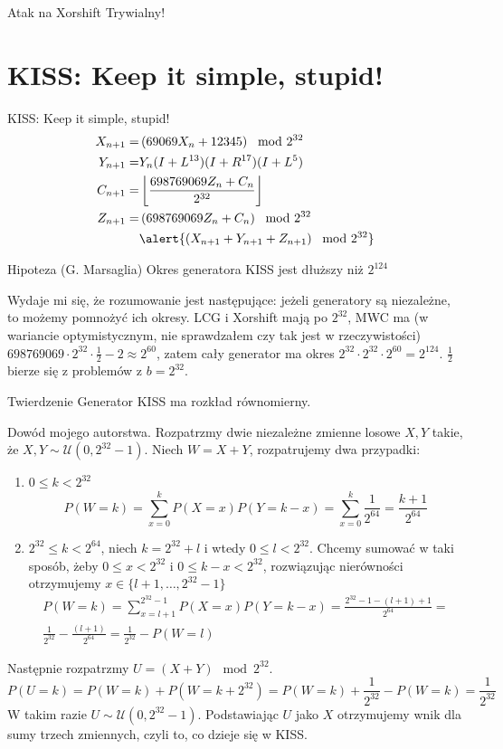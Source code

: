 \documentclass{mp}
\begin{document}
\begin{frame}{Atak na Xorshift}
\centering
\alert{Trywialny!}
\end{frame}

\section{KISS: Keep it simple, stupid!}

\begin{frame}{KISS: Keep it simple, stupid!}
\begin{align*}
X_{n+1} = & \left(69069 X_n + 12345\right) \mod 2^{32} \\
Y_{n+1} = & Y_n(I+L^{13})(I+R^{17})(I+L^5) \\
C_{n+1} = & \left\lfloor \frac{698769069Z_n+C_n}{2^{32}}\right\rfloor \\
Z_{n+1} = & \left(698769069Z_n+C_n\right) \mod 2^{32} \\
 & \alert{\left(X_{n+1}+Y_{n+1}+Z_{n+1}\right) \mod 2^{32}}
\end{align*}
\pause
\begin{block}{Hipoteza (G. Marsaglia)}
Okres generatora KISS jest dłuższy niż $2^{124}$
\end{block}
{
Wydaje mi się, że rozumowanie jest następujące: jeżeli generatory są niezależne, to możemy pomnożyć ich okresy. LCG i Xorshift mają po $2^{32}$, MWC ma (w wariancie optymistycznym, nie sprawdzałem czy tak jest w rzeczywistości) $698769069\cdot 2^{32}\cdot\frac{1}{2}-2\approx 2^{60}$, zatem cały generator ma okres $2^{32}\cdot 2^{32}\cdot 2^{60}=2^{124}$. $\frac{1}{2}$ bierze się z problemów z $b=2^{32}$.
}
\pause
\begin{block}{Twierdzenie}
Generator KISS ma rozkład równomierny.
\end{block}
{
\scriptsize
Dowód mojego autorstwa.
Rozpatrzmy dwie niezależne zmienne losowe $X, Y$ takie, że $X,Y \sim \mathcal{U}(0,2^{32}-1)$.
Niech $W=X+Y$, rozpatrujemy dwa przypadki:
\begin{enumerate}
\item $0\leq k< 2^{32}$
\[ P(W=k)=\sum_{x=0}^k P(X=x)P(Y=k-x) = \sum_{x=0}^k \frac{1}{2^{64}} = \frac{k+1}{2^{64}} \]
\item $2^{32}\leq k<2^64$, niech $k=2^{32}+l$ i wtedy $0\leq l<2^{32}$.
Chcemy sumować w taki sposób, żeby $0\leq x<2^{32}$ i $0\leq k-x<2^{32}$, rozwiązując nierówności otrzymujemy $x\in\{l+1,\ldots,2^{32}-1\}$
\[ 
\begin{split}
P(W=k)=\sum_{x=l+1}^{2^{32}-1} P(X=x)P(Y=k-x) = \frac{2^{32}-1-(l+1)+1}{2^64}= \\
\frac{1}{2^{32}}-\frac{(l+1)}{2^{64}}=\frac{1}{2^{32}}-P(W=l) 
\end{split}
\]
\end{enumerate}
Następnie rozpatrzmy $U=(X+Y)\mod 2^{32}$.
\[ P(U=k)=P(W=k)+P(W=k+2^{32})=P(W=k)+\frac{1}{2^{32}}-P(W=k)=\frac{1}{2^{32}} \]
W takim razie $U\sim\mathcal{U}(0,2^{32}-1)$.
Podstawiając $U$ jako $X$ otrzymujemy wnik dla sumy trzech zmiennych, czyli to, co dzieje się w KISS.
}
\end{frame}
\end{document}
